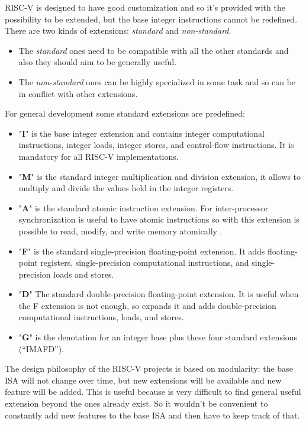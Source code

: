 RISC-V is designed to have good customization and so it's provided with the possibility to be extended, but the base integer instructions cannot be redeﬁned.\\
There are two kinds of extensions:
\textit{standard} and \textit{non-standard}.
\begin{itemize}
    \item The \textit{standard} ones need to be compatible with all the other standards and also they should aim to be generally useful.
    \item The \textit{non-standard} ones can be highly specialized in some task and so can be in conflict with other extensions.
\end{itemize}

For general development some standard extensions are predefined:
\begin{itemize}
    \item "\textbf{I}" is the base integer extension and contains integer computational instructions, integer loads, integer stores, and control-ﬂow instructions. It is mandatory for all RISC-V implementations.
    
    \item "\textbf{M}" is the standard integer multiplication and division extension, it allows to multiply and divide the values held in the integer registers.
    
    \item "\textbf{A}" is the standard atomic instruction extension. For inter-processor synchronization is useful to have atomic instructions so with this extension is possible to read, modify, and write memory atomically . 
    
    \item "\textbf{F}" is the standard single-precision ﬂoating-point extension. It adds ﬂoating-point registers, single-precision computational instructions, and single-precision loads and stores. 
    
    \item "\textbf{D}" The standard double-precision ﬂoating-point extension. It is useful when the F extension is not enough, so expands it and adds double-precision computational instructions, loads, and stores.
    
    \item "\textbf{G}" is the denotation for an integer base plus these four standard extensions (“IMAFD”).
\end{itemize}


The design philosophy of the RISC-V projects is based on modularity: the base ISA will not change over time, but new extensions will be available and new feature will be added. This is useful because is very difficult to find general useful extension beyond the ones already exist. So it wouldn't be convenient to constantly add new features to the base ISA and then have to keep track of that.\\

